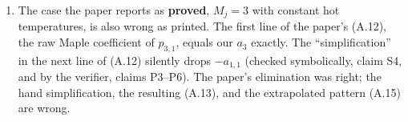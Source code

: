 \documentclass[11pt,a4paper]{report}
\begin{document}
\begin{enumerate}
\begin{itemize}
with \(M_1 = 4\) and \(M_1 = 5\) (claims X3a, X3b), and the paper's own Appendix~B data give an \(M_1 = 4\)
counterexample to Theorem 3 (Section~\ref{sec:appB}, claim B3) and, with all prices set to 1, to Theorem 2.
\end{itemize}
The computer-algebra checks for \(M = 3,\dots,8\) and the random tests for \(M \le 8\) find the difference
\(T^P_J - T^*_J\) to be a nonzero rational function, and nonzero in every draw.
\item The case the paper reports as \textbf{proved}, \(M_j = 3\) with constant hot temperatures, is also wrong as
printed. The first line of the paper's (A.12), the raw Maple coefficient of \(p_{3,1}\), equals our \(a_3\) exactly. The
``simplification'' in the next line of (A.12) silently drops \(-a_{1,1}\) (checked symbolically, claim S4, and
by the verifier, claims P3--P6). The paper's elimination was right; the hand simplification, the resulting
(A.13), and the extrapolated pattern (A.15) are wrong.
\end{enumerate}
\end{document}
